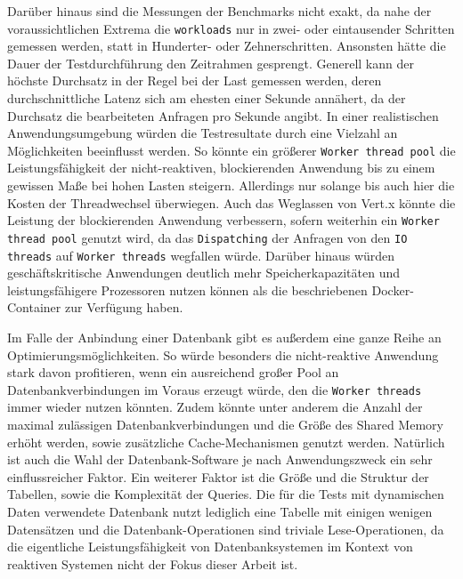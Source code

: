 Darüber hinaus sind die Messungen der Benchmarks nicht exakt, da nahe der voraussichtlichen Extrema die \verb|workloads|
nur in zwei- oder eintausender Schritten gemessen werden, statt in Hunderter- oder Zehnerschritten.
Ansonsten hätte die Dauer der Testdurchführung den Zeitrahmen gesprengt.
Generell kann der höchste Durchsatz in der Regel bei der Last gemessen werden, deren durchschnittliche Latenz sich am ehesten
einer Sekunde annähert, da der Durchsatz die bearbeiteten Anfragen pro Sekunde angibt.
\newline\newline
In einer realistischen Anwendungsumgebung würden die Testresultate durch eine Vielzahl an Möglichkeiten beeinflusst werden.
So könnte ein größerer \verb|Worker thread pool| die Leistungsfähigkeit der nicht-reaktiven, blockierenden
Anwendung bis zu einem gewissen Maße bei hohen Lasten steigern. Allerdings nur solange bis auch hier die Kosten der Threadwechsel
überwiegen. Auch das Weglassen von Vert.x könnte die Leistung der blockierenden Anwendung verbessern, sofern weiterhin
ein \verb|Worker thread pool| genutzt wird, da das \verb|Dispatching| der Anfragen von den \verb|IO threads| auf
\verb|Worker threads| wegfallen würde. Darüber hinaus würden geschäftskritische Anwendungen deutlich mehr Speicherkapazitäten und leistungsfähigere
Prozessoren nutzen können als die beschriebenen Docker-Container zur Verfügung haben.

Im Falle der Anbindung einer Datenbank gibt es außerdem eine ganze Reihe an Optimierungsmöglichkeiten.
So würde besonders die nicht-reaktive Anwendung stark davon profitieren, wenn ein ausreichend großer Pool an Datenbankverbindungen
im Voraus erzeugt würde, den die \verb|Worker threads| immer wieder nutzen könnten.
Zudem könnte unter anderem die Anzahl der maximal zulässigen
Datenbankverbindungen und die Größe des Shared Memory erhöht werden, sowie zusätzliche Cache-Mechanismen genutzt werden.
Natürlich ist auch die Wahl der Datenbank-Software je nach Anwendungszweck ein sehr einflussreicher Faktor.
\newline\newline
Ein weiterer Faktor ist die Größe und die Struktur der Tabellen, sowie die Komplexität der Queries.
Die für die Tests mit dynamischen Daten verwendete Datenbank nutzt lediglich eine Tabelle mit einigen wenigen Datensätzen und die
Datenbank-Operationen sind triviale Lese-Operationen,
da die eigentliche Leistungsfähigkeit von Datenbanksystemen im Kontext von reaktiven Systemen nicht der Fokus dieser Arbeit ist.

